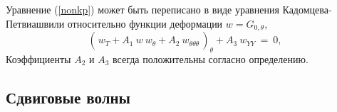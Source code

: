 Уравнение (\ref{nonkp}) может быть переписано в виде уравнения Кадомцева-Петвиашвили \cite{Ablowitz} относительно функции деформации $w=G_{0,\theta}$,
\begin{equation}
	\left(\frac{}{} w_{ T}+ A_1~ w~ w_{ \theta} +A_2 ~w_{\theta \theta \theta} \frac{}{}\right)_\theta+ A_3~ w_{Y Y}~=~0, \label{kp}
\end{equation}
Коэффициенты $A_2$ и $A_3$ всегда положительны согласно определению.

\subsection{Сдвиговые волны}

